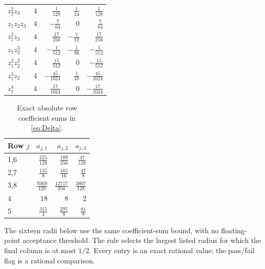 \documentclass[11pt,a4paper]{article}
\numberwithin{equation}{section}
\theoremstyle{definition}
\theoremstyle{remark}
\begin{document}
\begin{longtable}{@{}lrrrr@{}}
$z_{2}^{2}z_{3}$ & 4 & $\frac{1}{128}$ & $\frac{1}{24}$ & $\frac{1}{128}$ \\
$z_{1}z_{2}z_{3}$ & 4 & $-\frac{7}{64}$ & $0$ & $\frac{7}{64}$ \\
$z_{1}^{2}z_{3}$ & 4 & $\frac{17}{256}$ & $-\frac{1}{12}$ & $\frac{17}{256}$ \\
$z_{1}z_{2}^{3}$ & 4 & $-\frac{1}{512}$ & $-\frac{1}{96}$ & $-\frac{1}{512}$ \\
$z_{1}^{2}z_{2}^{2}$ & 4 & $\frac{15}{512}$ & $0$ & $-\frac{15}{512}$ \\
$z_{1}^{3}z_{2}$ & 4 & $-\frac{45}{1024}$ & $\frac{1}{48}$ & $-\frac{45}{1024}$ \\
$z_{1}^{4}$ & 4 & $\frac{17}{1024}$ & $0$ & $-\frac{17}{1024}$ \\
\bottomrule
\end{longtable}
\endgroup

\begin{table}[htbp]
\centering
\caption{Exact absolute row coefficient sums in \eqref{eq:Delta}.}\label{tab:majorant}
\renewcommand{\arraystretch}{1.7}
\begin{tabular}{@{}lrrr@{}}
\toprule
Row $j$ & $a_{j,1}$ & $a_{j,2}$ & $a_{j,3}$ \\
\midrule
1,6 & $\frac{225}{128}$ & $\frac{189}{256}$ & $\frac{47}{128}$ \\
2,7 & $\frac{135}{8}$ & $\frac{165}{16}$ & $\frac{47}{8}$ \\
3,8 & $\frac{9369}{128}$ & $\frac{12717}{256}$ & $\frac{3807}{128}$ \\
4 & $18$ & $8$ & $2$ \\
5 & $\frac{315}{4}$ & $\frac{297}{8}$ & $\frac{81}{8}$ \\
\bottomrule
\end{tabular}
\end{table}

The sixteen radii below use the same coefficient-sum bound, with no
floating-point acceptance threshold. The rule selects the largest listed
radius for which the final column is at most $1/2$. Every entry is an
exact rational value; the pass/fail flag is a rational comparison.
\end{document}
